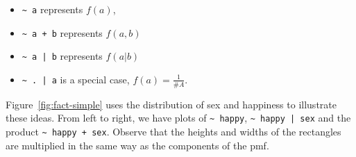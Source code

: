 \documentclass[letterpaper,oneside]{scrartcl}
\begin{document}
\begin{itemize}
  \item \verb|~ a| represents $f(a)$,
  \item \verb|~ a + b| represents $f(a, b)$
  \item \verb!~ a | b! represents $f(a | b)$
  \item \verb!~ . | a! is a special case, $f(a) = \frac{1}{\#A}$.
\end{itemize}

Figure~\ref{fig:fact-simple} uses the distribution of sex and happiness to illustrate these ideas. From left to right, we have plots of \verb|~ happy|, \verb!~ happy | sex! and the product \verb|~ happy + sex|. Observe that the heights and widths of the rectangles are multiplied in the same way as the components of the pmf.
\end{document}
